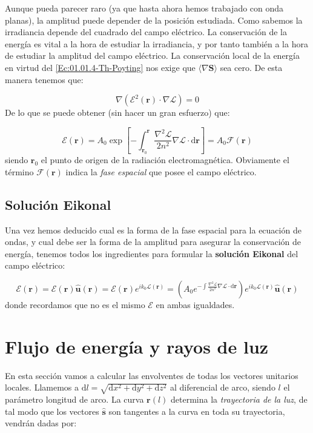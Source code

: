 \documentclass[12pt,a4paper]{book}
\numberwithin{equation}{section}
\numberwithin{figure}{section}
\newcommand{\parentesis}[1]{\left( #1  \right)}
\newcommand{\ccorchetes}[1]{\left[ #1  \right]}
\newcommand{\D}{\mathrm{d}}
\newcommand{\1}{_{(1)}}
\newcommand{\2}{_{(2)}}
\newcommand{\un}{\mathbf{u}}
\newcommand{\rn}{\mathbf{r}}
\newcommand{\sn}{\mathbf{s}}
\newcommand{\Sn}{\mathbf{S}}
\newcommand{\Encal}{\boldsymbol{\mathcal{E}}}
\newcommand{\hnu}{\hat{\un}}
\newcommand{\hns}{\hat{\sn}}
\theoremstyle{definition}
\begin{document}
Aunque pueda parecer raro (ya que hasta ahora hemos trabajado con onda planas), la amplitud puede depender de la posición estudiada. Como sabemos la irradiancia depende del cuadrado del campo eléctrico. La conservación de la energía es vital a la hora de estudiar la irradiancia, y por tanto también a la hora de estudiar la amplitud del campo eléctrico. La conservación local de la energía en virtud del \ref{Ec:01.01.4-Th-Poyting} nos exige que $\langle \nabla \Sn \rangle$ sea cero. De esta manera tenemos que:

$$ \nabla (\mathcal{E}^2 (\rn ) \cdot \nabla \mathcal{L}) = 0 $$
De lo que se puede obtener (sin hacer un gran esfuerzo) que:

\begin{equation}
 \mathcal{E} (\rn) = A_0 \exp \ccorchetes{ - \int_{\rn_0}^{\rn} \frac{\nabla^2 \mathcal{L}}{2 n^2}  \nabla \mathcal{L} \cdot \D \rn }  = A_0 \mathcal{F} (\rn)
\end{equation}
siendo $\rn_0$ el punto de origen de la radiación electromagnética. Obviamente el término $\mathcal{F}(\rn)$ indica la \textit{fase espacial} que posee el campo eléctrico.
\subsection{Solución Eikonal}

Una vez hemos deducido cual es la forma de la fase espacial para la ecuación de ondas, y cual debe ser la forma de la amplitud para asegurar la conservación de energía, tenemos todos los ingredientes para formular la \textbf{solución Eikonal} del campo eléctrico:

\begin{equation}
\Encal (\rn) = \mathcal{E} (\rn) \hnu (\rn) = \mathcal{E} (\rn) e^{i k_0 \mathcal{L} (\rn)}  = \parentesis{ A_0 e^{- \int \frac{\nabla^2 \mathcal{L}}{2 n^2} \nabla \mathcal{L} \cdot \D \rn } } e^{i k_0 \mathcal{L} (\rn)} \hnu (\rn)
\end{equation}
donde recordamos que no es  el mismo $\Encal$ en ambas igualdades. 

\section{Flujo de energía y rayos de luz}

En esta sección vamos a calcular las envolventes de todas los vectores unitarios locales. Llamemos a $\D l = \sqrt{\D x^2 + \D y^2 + \D z^2}$ al diferencial de arco, siendo $l$ el parámetro longitud de arco.  La curva $\rn (l)$ determina la \textit{trayectoria de la luz}, de tal modo que los vectores $\hns$ son tangentes a la curva en toda su trayectoria, vendrán dadas por:
\end{document}
